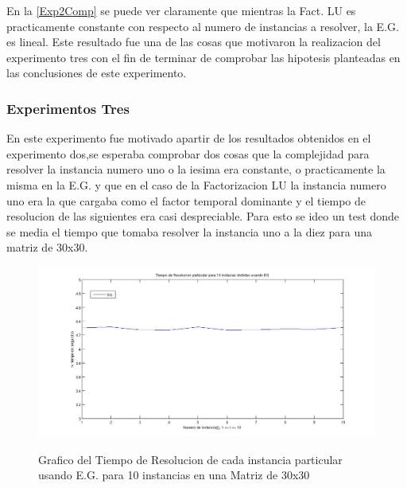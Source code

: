 \documentclass[12pt,a4paper]{article}
\begin{document}
En la \ref{Exp2Comp} se puede ver claramente que mientras la Fact. LU es practicamente constante con respecto al numero de instancias a resolver, la E.G. es lineal. Este resultado fue una de las cosas que motivaron la realizacion del experimento tres con el fin de terminar de comprobar las hipotesis planteadas en las conclusiones de este experimento.

\subsubsection{Experimentos Tres}

En este experimento fue motivado apartir de los resultados obtenidos en el experimento dos,se esperaba comprobar dos cosas que la complejidad para resolver la instancia numero uno o la iesima era constante, o practicamente la misma en la E.G. y que en el caso de la Factorizacion LU la instancia numero uno era la que cargaba como el factor temporal dominante y el tiempo de resolucion de las siguientes era casi despreciable. Para esto se ideo un test donde se media el tiempo que tomaba resolver la instancia uno a la diez para una matriz de 30x30.
\begin{figure}[h!]
\centering
\caption{Grafico del Tiempo de Resolucion de cada instancia particular usando E.G. para 10 instancias en una Matriz de 30x30}
\includegraphics[width=16cm]{tmp10InstFijasEG.jpg}
\label{Exp3EG}
\end{figure}
\end{document}
